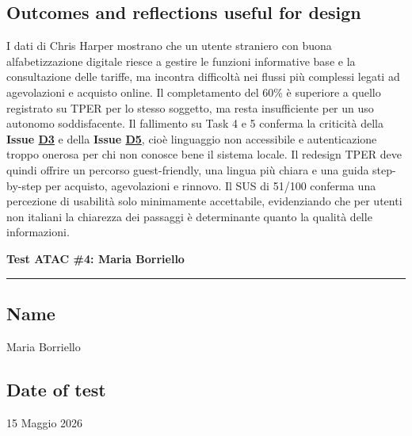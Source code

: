 ﻿\documentclass[11pt,a4paper]{article}
\begin{document}
\subsection*{Outcomes and reflections useful for design}
\begin{tcolorbox}[base]
I dati di Chris Harper mostrano che un utente straniero con buona alfabetizzazione digitale riesce a gestire le funzioni informative base e la consultazione delle tariffe, ma incontra difficoltà nei flussi più complessi legati ad agevolazioni e acquisto online. Il completamento del 60\% è superiore a quello registrato su TPER per lo stesso soggetto, ma resta insufficiente per un uso autonomo soddisfacente. Il fallimento su Task 4 e 5 conferma la criticità della \textbf{Issue \hyperref[atac:D3]{D3}} e della \textbf{Issue \hyperref[atac:D5]{D5}}, cioè linguaggio non accessibile e autenticazione troppo onerosa per chi non conosce bene il sistema locale. Il redesign TPER deve quindi offrire un percorso guest-friendly, una lingua più chiara e una guida step-by-step per acquisto, agevolazioni e rinnovo. Il SUS di 51/100 conferma una percezione di usabilità solo minimamente accettabile, evidenziando che per utenti non italiani la chiarezza dei passaggi è determinante quanto la qualità delle informazioni.
\end{tcolorbox}


\newpage
\begin{center}
  {\color{secondaryColor}\large\bfseries
  Test ATAC \#4: Maria Borriello}\\
  \vspace{0.1cm}
  \color{borderColor}\hrule
\end{center}

\vspace{0.5cm}

\subsection*{Name}
\begin{tcolorbox}[base]
Maria Borriello
\end{tcolorbox}

\subsection*{Date of test}
\begin{tcolorbox}[base]
15 Maggio 2026
\end{tcolorbox}
\end{document}
